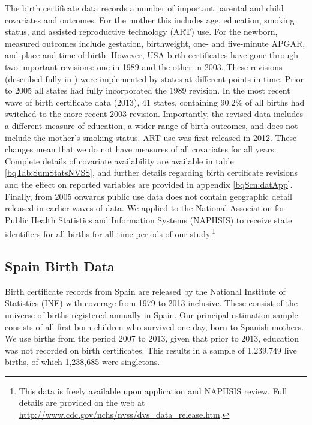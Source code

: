 \documentclass[a4paper, 11 pt]{article}
\theoremstyle{plain}
\begin{document}
\begin{spacing}{1.2}
The birth certificate data records a number of important parental and child
covariates and outcomes.  For the mother this includes age, education, smoking
status, and assisted reproductive technology (ART) use. For the newborn, measured
outcomes include gestation, birthweight, one- and five-minute APGAR, and place 
and time of birth. However, USA birth certificates have gone through two 
important revisions: one in 1989 and the other in 2003.  These revisions 
(described fully in \citet{NCHS2000}) were implemented
by states at different points in time.  Prior to 2005 all states had fully 
incorporated the 1989 revision.  In the most recent wave of birth certificate
data (2013), 41 states, containing 90.2\% of all births had switched to the
more recent 2003 revision.  Importantly, the revised data includes a different
measure of education, a wider range of birth outcomes, and does not include
the mother's smoking status.  ART use was first released in 2012. These changes
mean that we do not have measures of all covariates for all years.  Complete
details of covariate availability are available in table 
\ref{bqTab:SumStatsNVSS}, and further details regarding birth certificate 
revisions and the effect on reported variables are provided in appendix
\ref{bqScn:datApp}.  Finally, from 2005 onwards public use data does not 
contain geographic detail released in earlier waves of data.  We applied to
the National Association for Public Health Statistics and Information Systems 
(NAPHSIS) to receive state identifiers for all births for all time periods
of our study.\footnote{This data is freely available upon application and
NAPHSIS review.  Full details are provided on the web at
\href{http://www.cdc.gov/nchs/nvss/dvs_data_release.htm}{http://www.cdc.gov/nchs/nvss/dvs\_data\_release.htm}.}


\subsection{Spain Birth Data}
Birth certificate records from Spain are released by the National Institute
of Statistics (INE) with coverage from 1979 to 2013 inclusive.  These consist 
of the universe of births registered annually in Spain.  Our principal 
estimation sample consists of all first born children who survived one day,
born to Spanish mothers.  We use births from the period 2007 to 2013, given
that prior to 2013, education was not recorded on birth certificates.  This
results in a sample of 1,239,749 live births, of which 1,238,685 were 
singletons.


\end{spacing}
\end{document}
